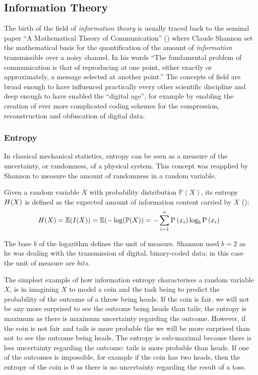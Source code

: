 \subsection{Information Theory}
The birth of the field of \textit{information theory} is usually traced back to the seminal paper \enquote{A Mathematical Theory of Communication} (\cite{Shannon1949}) where Claude Shannon set the mathematical basis for the quantification of the amount of \textit{information} transmissible over a noisy channel. 
In his words \enquote{The fundamental problem of communication is that of reproducing at one point, either exactly or approximately, a message selected at another point.}
The concepts of field are broad enough to have influenced practically every other scientific discipline and deep enough to have enabled the \enquote{digital age}, for example by enabling the creation of ever more complicated coding schemes for the compression, reconstruction and obfuscation of digital data.

\subsubsection{Entropy}
In classical mechanical statistics, entropy can be seen as a measure of the uncertainty, or randomness, of a physical system.  
This concept was reapplied by Shannon to measure the amount of randomness in a random variable.
\begin{definition}
	Given a random variable $X$ with probability distribution $\mathbb{P}(X)$, its entropy $H(X)$ is defined as the expected amount of information content carried by $X$ (\cite{Schneider2005}):
\begin{equation} \label{eq:entropy}
	H(X) = \mathbb{E}(I(X)) = \mathbb{E}(-\log (\mathbb{P}(X)) = -\sum_{i=1}^{n} \mathrm{P}\left(x_{i}\right) \log _{b} \mathrm{P}\left(x_{i}\right)
\end{equation}
\end{definition}
The base $b$ of the logarithm defines the unit of measure.  Shannon used $b=2$ as he was dealing with the transmission of digital, binary-coded data; in this case the unit of measure are $bits$.

The simplest example of how information entropy characterises a random variable $X$, is in imagining $X$ to model a coin and the task being to predict the probability of the outcome of a throw being heads.
If the coin is fair, we will not be any more surprised to see the outcome being heads than tails; the entropy is maximum as there is maximum uncertainty regarding the outcome.
However, if the coin is not fair and tails is more probable the we will be more surprised than not to see the outcome being heads.  
The entropy is sub-maximal because there is less uncertainty regarding the outcome: tails is more probable than heads.
If one of the outcomes is impossible, for example if the coin has two heads, then the entropy of the coin is $0$ as there is no uncertainty regarding the result of a toss.


